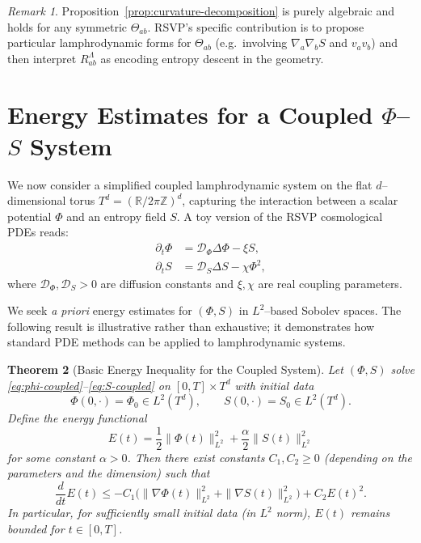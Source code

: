 \documentclass[12pt]{article}
\theoremstyle{plain}
\newtheorem{theorem}{Theorem}[section]
\theoremstyle{definition}
\theoremstyle{remark}
\newtheorem{remark}[theorem]{Remark}
\begin{document}
\begin{remark}
Proposition~\ref{prop:curvature-decomposition} is purely algebraic and holds
for any symmetric $\Theta_{ab}$. RSVP's specific contribution is to propose
particular lamphrodynamic forms for $\Theta_{ab}$ (e.g.\ involving $\nabla_a
\nabla_b S$ and $v_a v_b$) and then interpret $R^{\Lambda}_{ab}$ as encoding
entropy descent in the geometry.
\end{remark}

\newpage

\section{Energy Estimates for a Coupled $\Phi$--$S$ System}

We now consider a simplified coupled lamphrodynamic system on the flat
$d$--dimensional torus $T^d = (\mathbb{R}/2\pi\mathbb{Z})^d$, capturing the
interaction between a scalar potential $\Phi$ and an entropy field $S$.
A toy version of the RSVP cosmological PDEs reads:
\begin{align}
    \partial_t \Phi &= \mathcal{D}_\Phi \Delta \Phi - \xi S,
    \label{eq:phi-coupled} \\
    \partial_t S    &= \mathcal{D}_S \Delta S - \chi \Phi^2,
    \label{eq:S-coupled}
\end{align}
where $\mathcal{D}_\Phi,\mathcal{D}_S > 0$ are diffusion constants and
$\xi,\chi$ are real coupling parameters.

We seek \emph{a priori} energy estimates for $(\Phi,S)$ in $L^2$--based
Sobolev spaces. The following result is illustrative rather than exhaustive;
it demonstrates how standard PDE methods can be applied to lamphrodynamic
systems.

\begin{theorem}[Basic Energy Inequality for the Coupled System]
\label{thm:phi-S-energy}
Let $(\Phi,S)$ solve \eqref{eq:phi-coupled}--\eqref{eq:S-coupled} on
$[0,T]\times T^d$ with initial data
\[
    \Phi(0,\cdot) = \Phi_0 \in L^2(T^d),
    \qquad
    S(0,\cdot) = S_0 \in L^2(T^d).
\]
Define the energy functional
\[
    E(t)
    = \frac12 \|\Phi(t)\|_{L^2}^2
    + \frac{\alpha}{2}\|S(t)\|_{L^2}^2
\]
for some constant $\alpha>0$. Then there exist constants
$C_1, C_2 \ge 0$ (depending on the parameters and the dimension) such that
\begin{equation}
    \frac{d}{dt} E(t)
    \le - C_1 \big(
        \|\nabla \Phi(t)\|_{L^2}^2
        + \|\nabla S(t)\|_{L^2}^2
    \big)
    + C_2 E(t)^2.
    \label{eq:phi-S-energy-ineq}
\end{equation}
In particular, for sufficiently small initial data (in $L^2$ norm), $E(t)$
remains bounded for $t\in[0,T]$.
\end{theorem}
\end{document}
